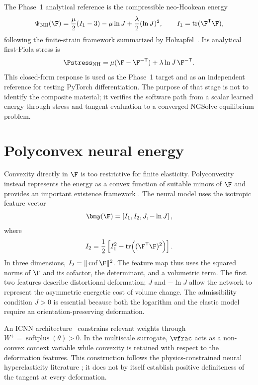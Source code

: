 The Phase~1 analytical reference is the compressible neo-Hookean energy
\begin{equation}
  \Psi_{\mathrm{NH}}(\F)
  =\frac{\mu}{2}(I_1-3)-\mu\ln J
   +\frac{\lambda}{2}(\ln J)^2,
  \qquad I_1=\operatorname{tr}(\F^\mathsf T\F),
  \label{eq:neo-hooke}
\end{equation}
following the finite-strain framework summarized by
Holzapfel~\cite{holzapfel2000}.
Its analytical first-Piola stress is
\begin{equation}
  \Pstress_{\mathrm{NH}}
  =\mu(\F-\F^{-\mathsf T})
   +\lambda\ln J\,\F^{-\mathsf T}.
  \label{eq:neo-hooke-stress}
\end{equation}
This closed-form response is used as the Phase~1 target and as an independent
reference for testing PyTorch differentiation. The purpose of that stage is
not to identify the composite material; it verifies the software path from a
scalar learned energy through stress and tangent evaluation to a converged
NGSolve equilibrium problem.

\section{Polyconvex neural energy}

Convexity directly in \(\F\) is too restrictive for finite elasticity.
Polyconvexity instead represents the energy as a convex function of suitable
minors of \(\F\) and provides an important existence framework
\cite{ball1977}. The neural model uses the isotropic feature vector
\begin{equation}
  \bm y(\F)=\left[I_1,I_2,J,-\ln J\right],
\end{equation}
where
\begin{equation}
  I_2=\frac12\left[
    I_1^2-\operatorname{tr}\!\left((\F^\mathsf T\F)^2\right)
  \right].
\end{equation}
In three dimensions, \(I_2=\|\operatorname{cof}\F\|^2\). The feature map thus
uses the squared norms of \(\F\) and its cofactor, the determinant, and a
volumetric term. The first two features describe distortional deformation;
\(J\) and \(-\ln J\) allow the network to represent the asymmetric energetic
cost of volume change. The admissibility condition \(J>0\) is essential
because both the logarithm and the elastic model require an
orientation-preserving deformation.

An ICNN architecture~\cite{amos2017} constrains relevant weights through
\(W^+=\operatorname{softplus}(\theta)>0\). In the multiscale surrogate,
\(\vfrac\) acts as a non-convex context variable while convexity is retained
with respect to the deformation features. This construction follows the
physics-constrained neural hyperelasticity literature
\cite{kalina2022,linden2023}; it does not by itself establish positive
definiteness of the tangent at every deformation.


